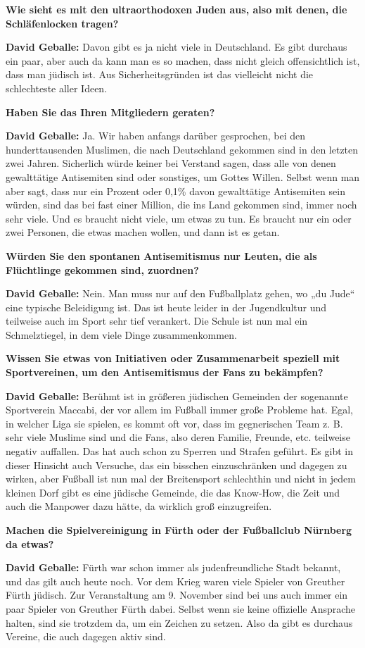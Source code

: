 \textbf{Wie sieht es mit den ultraorthodoxen Juden aus, also mit denen, die Schläfenlocken tragen?} 

\textbf{David Geballe:} Davon gibt es ja nicht viele in Deutschland. Es gibt durchaus ein paar, aber auch da kann man es so machen, dass nicht gleich offensichtlich ist, dass man jüdisch ist. Aus Sicherheitsgründen ist das vielleicht nicht die schlechteste aller Ideen. 

\textbf{Haben Sie das Ihren Mitgliedern geraten?} 

\textbf{David Geballe:} Ja. Wir haben anfangs darüber gesprochen, bei den hunderttausenden Muslimen, die nach Deutschland gekommen sind in den letzten zwei Jahren. Sicherlich würde keiner bei Verstand sagen, dass alle von denen gewalttätige Antisemiten sind oder sonstiges, um Gottes Willen. Selbst wenn man aber sagt, dass nur ein Prozent oder 0,1\% davon gewalttätige Antisemiten sein würden, sind das bei fast einer Million, die ins Land gekommen sind, immer noch sehr viele. Und es braucht nicht viele, um etwas zu tun. Es braucht nur ein oder zwei Personen, die etwas machen wollen, und dann ist es getan. 

\textbf{Würden Sie den spontanen Antisemitismus nur Leuten, die als Flüchtlinge gekommen sind, zuordnen?} 

\textbf{David Geballe:} Nein. Man muss nur auf den Fußballplatz gehen, wo „du Jude“ eine typische Beleidigung ist. Das ist heute leider in der Jugendkultur und teilweise auch im Sport sehr tief verankert. Die Schule ist nun mal ein Schmelztiegel, in dem viele Dinge zusammenkommen. 

\textbf{Wissen Sie etwas von Initiativen oder Zusammenarbeit speziell mit Sportvereinen, um den Antisemitismus der Fans zu bekämpfen?} 

\textbf{David Geballe:} Berühmt ist in größeren jüdischen Gemeinden der sogenannte Sportverein Maccabi, der vor allem im Fußball immer große Probleme hat. Egal, in welcher Liga sie spielen, es kommt oft vor, dass im gegnerischen Team z. B. sehr viele Muslime sind und die Fans, also deren Familie, Freunde, etc. teilweise negativ auffallen. Das hat auch schon zu Sperren und Strafen geführt. Es gibt in dieser Hinsicht auch Versuche, das ein bisschen einzuschränken und dagegen zu wirken, aber Fußball ist nun mal der Breitensport schlechthin und nicht in jedem kleinen Dorf gibt es eine jüdische Gemeinde, die das Know-How, die Zeit und auch die Manpower dazu hätte, da wirklich groß einzugreifen. 

\textbf{Machen die Spielvereinigung in Fürth oder der Fußballclub Nürnberg da etwas?} 

\textbf{David Geballe:} Fürth war schon immer als judenfreundliche Stadt bekannt, und das gilt auch heute noch. Vor dem Krieg waren viele Spieler von Greuther Fürth jüdisch. Zur Veranstaltung am 9. November sind bei uns auch immer ein paar Spieler von Greuther Fürth dabei. Selbst wenn sie keine offizielle Ansprache halten, sind sie trotzdem da, um ein Zeichen zu setzen. Also da gibt es durchaus Vereine, die auch dagegen aktiv sind. 

 

 